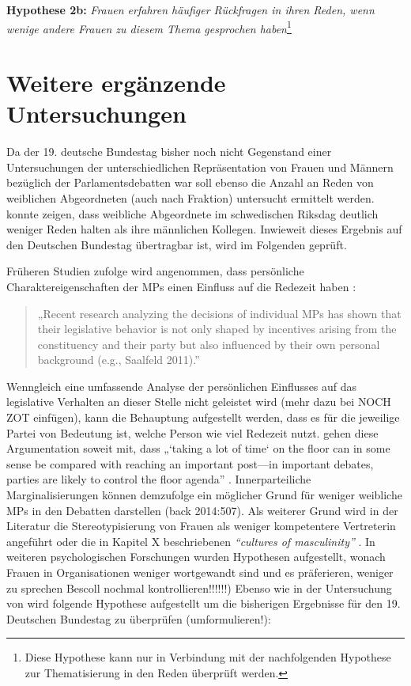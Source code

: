 \documentclass[12pt, 
    twoside=false, 
    bibliography=totoc, 
    numbers=endperiod, 
    headings=normal, 
    toc=chapterentrydotfill
    ]{scrbook}
\begin{document}
\textbf{Hypothese 2b:} \emph{Frauen erfahren häufiger Rückfragen in ihren Reden, wenn wenige andere Frauen zu diesem Thema gesprochen haben}\footnote{Diese Hypothese kann nur in Verbindung mit der nachfolgenden Hypothese zur Thematisierung in den Reden überprüft werden.}



\section{Weitere ergänzende Untersuchungen}

Da der 19. deutsche Bundestag bisher noch nicht Gegenstand einer Untersuchungen der unterschiedlichen Repräsentation von Frauen und Männern bezüglich der Parlamentsdebatten war soll ebenso die Anzahl an Reden von weiblichen Abgeordneten (auch nach Fraktion) untersucht ermittelt werden. \textcite{back_2014} konnte zeigen, dass weibliche Abgeordnete im schwedischen Riksdag deutlich weniger Reden halten als ihre männlichen Kollegen. Inwieweit dieses Ergebnis auf den Deutschen Bundestag übertragbar ist, wird im Folgenden geprüft.

Früheren Studien zufolge wird angenommen, dass persönliche Charaktereigenschaften der MPs einen Einfluss auf die Redezeit haben \parencite[505]{back_2014}:

\endquote
\begin{quote}
    „Recent research analyzing the decisions of individual MPs has shown that their legislative behavior is not only shaped by incentives arising from the constituency and their party but also influenced by their own personal background (e.g., Saalfeld 2011).”
\end{quote} \parencite[505]{back_2014}
 
Wenngleich eine umfassende Analyse der persönlichen Einflusses auf das legislative Verhalten an dieser Stelle nicht geleistet wird (mehr dazu bei \textcite{saalfeld_2011} NOCH ZOT einfügen), kann die Behauptung aufgestellt werden, dass es für die jeweilige Partei von Bedeutung ist, welche Person wie viel Redezeit nutzt. \textcite{proksch_2012} gehen diese Argumentation soweit mit, dass „‘taking a lot of time‘ on the floor can in some sense be compared with reaching an important post—in important debates, parties are likely to control the floor agenda” \parencites[507]{back_2014}. Innerparteiliche Marginalisierungen können demzufolge ein möglicher Grund für weniger weibliche MPs in den Debatten darstellen (back 2014:507). Als weiterer Grund wird in der Literatur die Stereotypisierung von Frauen als weniger kompetentere Vertreterin angeführt oder die in Kapitel X beschriebenen  \emph{“cultures of masculinity”}  \parencites[507]{back_2014}{lovenduski_2005}. In weiteren psychologischen Forschungen wurden Hypothesen aufgestellt, wonach Frauen in Organisationen weniger wortgewandt sind und es präferieren, weniger zu sprechen \parencites[507]{back_2014}[625]{brescoll_2011} Bescoll nochmal kontrollieren!!!!!!)
Ebenso wie in der Untersuchung von \textcite{back_2014} wird folgende Hypothese aufgestellt um die bisherigen Ergebnisse für den 19. Deutschen Bundestag zu überprüfen (umformulieren!):
\end{document}

